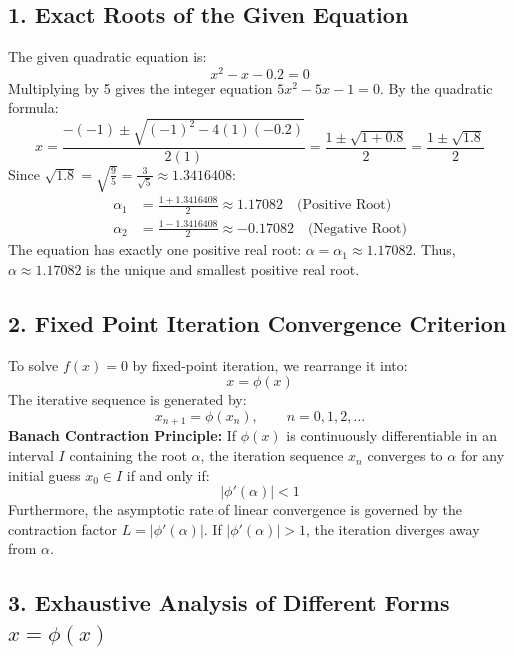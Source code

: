 \documentclass[11pt,a4paper]{article}
\newcommand{\abs}[1]{\left\lvert#1\right\rvert}
\begin{document}
\subsection*{1. Exact Roots of the Given Equation}
The given quadratic equation is:
\begin{equation}
x^2 - x - 0.2 = 0
\end{equation}
Multiplying by 5 gives the integer equation $5x^2 - 5x - 1 = 0$. By the quadratic formula:
\begin{equation}
x = \frac{-(-1) \pm \sqrt{(-1)^2 - 4(1)(-0.2)}}{2(1)} = \frac{1 \pm \sqrt{1 + 0.8}}{2} = \frac{1 \pm \sqrt{1.8}}{2}
\end{equation}
Since $\sqrt{1.8} = \sqrt{\frac{9}{5}} = \frac{3}{\sqrt{5}} \approx 1.3416408$:
\begin{align}
\alpha_1 &= \frac{1 + 1.3416408}{2} \approx \mathbf{1.17082} \quad \text{(Positive Root)} \\
\alpha_2 &= \frac{1 - 1.3416408}{2} \approx \mathbf{-0.17082} \quad \text{(Negative Root)}
\end{align}
The equation has exactly one positive real root: $\alpha = \alpha_1 \approx 1.17082$. Thus, $\alpha \approx 1.17082$ is the unique and smallest positive real root.

\subsection*{2. Fixed Point Iteration Convergence Criterion}
To solve $f(x) = 0$ by fixed-point iteration, we rearrange it into:
\begin{equation}
x = \phi(x)
\end{equation}
The iterative sequence is generated by:
\begin{equation}
x_{n+1} = \phi(x_n), \qquad n = 0, 1, 2, \dots
\end{equation}
\textbf{Banach Contraction Principle:} If $\phi(x)$ is continuously differentiable in an interval $I$ containing the root $\alpha$, the iteration sequence $x_n$ converges to $\alpha$ for any initial guess $x_0 \in I$ if and only if:
\begin{equation}
\abs{\phi'(\alpha)} < 1
\end{equation}
Furthermore, the asymptotic rate of linear convergence is governed by the contraction factor $L = \abs{\phi'(\alpha)}$. If $\abs{\phi'(\alpha)} > 1$, the iteration diverges away from $\alpha$.

\subsection*{3. Exhaustive Analysis of Different Forms $x = \phi(x)$}
\end{document}
